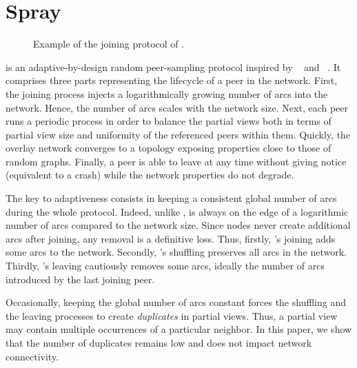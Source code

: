 
\section{Spray}
\label{sec:proposal}

\begin{figure*}
  \centering
  \hspace{8pt}
  \hspace{8pt}
  \caption{\label{fig:joiningexample}Example of the joining
    protocol of \SPRAY.}
\end{figure*}

\SPRAY is an adaptive-by-design random peer-sampling protocol inspired by
\SCAMP~\cite{ganesh2001scamp,ganesh2003peer} and
\CYCLON~\cite{voulgaris2005cyclon}. It comprises three parts representing the
lifecycle of a peer in the network.  First, the joining process injects a
logarithmically growing number of arcs into the network. Hence, the number of
arcs scales with the network size.  Next, each peer runs a periodic process in
order to balance the partial views both in terms of partial view size and
uniformity of the referenced peers within them. Quickly, the overlay network
converges to a topology exposing properties close to those of random
graphs. Finally, a peer is able to leave at any time without giving notice
(equivalent to a crash) while the network properties do not degrade.

The key to adaptiveness consists in keeping a consistent global number
of arcs during the whole protocol. Indeed, unlike \CYCLON, \SPRAY is
always on the edge of a logarithmic number of arcs compared to the
network size. Since \SPRAY nodes never create additional arcs after
joining, any removal is a definitive loss. Thus, firstly, \SPRAY's
joining adds some arcs to the network. Secondly, \SPRAY's shuffling
preserves all arcs in the network. Thirdly, \SPRAY's leaving
cautiously removes some arcs, ideally the number of arcs introduced by
the last joining peer.

Occasionally, keeping the global number of arcs constant forces the shuffling
and the leaving processes to create \emph{duplicates} in partial views. Thus,
a partial view may contain multiple occurrences of a particular neighbor. In this
paper, we show that the number of duplicates remains low and does not
impact network connectivity.


